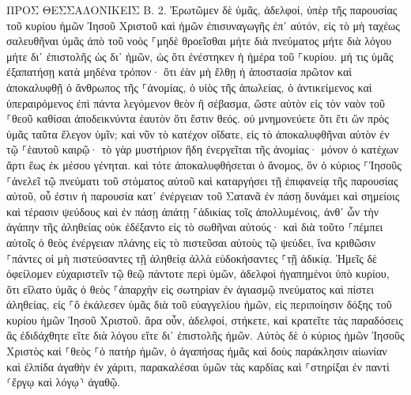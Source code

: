 \documentclass[twoside, 9pt]{extreport}
\begin{document}
ΠΡΟΣ ΘΕΣΣΑΛΟΝΙΚΕΙΣ Β.
2.
Ἐρωτῶμεν δὲ ὑμᾶς, ἀδελφοί, ὑπὲρ τῆς παρουσίας τοῦ κυρίου ἡμῶν Ἰησοῦ Χριστοῦ καὶ ἡμῶν ἐπισυναγωγῆς ἐπ᾽ αὐτόν, 
εἰς τὸ μὴ ταχέως σαλευθῆναι ὑμᾶς ἀπὸ τοῦ νοὸς ⸀μηδὲ θροεῖσθαι μήτε διὰ πνεύματος μήτε διὰ λόγου μήτε δι᾽ ἐπιστολῆς ὡς δι᾽ ἡμῶν, ὡς ὅτι ἐνέστηκεν ἡ ἡμέρα τοῦ ⸀κυρίου. 
μή τις ὑμᾶς ἐξαπατήσῃ κατὰ μηδένα τρόπον· ὅτι ἐὰν μὴ ἔλθῃ ἡ ἀποστασία πρῶτον καὶ ἀποκαλυφθῇ ὁ ἄνθρωπος τῆς ⸀ἀνομίας, ὁ υἱὸς τῆς ἀπωλείας, 
ὁ ἀντικείμενος καὶ ὑπεραιρόμενος ἐπὶ πάντα λεγόμενον θεὸν ἢ σέβασμα, ὥστε αὐτὸν εἰς τὸν ναὸν τοῦ ⸀θεοῦ καθίσαι ἀποδεικνύντα ἑαυτὸν ὅτι ἔστιν θεός. 
οὐ μνημονεύετε ὅτι ἔτι ὢν πρὸς ὑμᾶς ταῦτα ἔλεγον ὑμῖν; 
καὶ νῦν τὸ κατέχον οἴδατε, εἰς τὸ ἀποκαλυφθῆναι αὐτὸν ἐν τῷ ⸀ἑαυτοῦ καιρῷ· 
τὸ γὰρ μυστήριον ἤδη ἐνεργεῖται τῆς ἀνομίας· μόνον ὁ κατέχων ἄρτι ἕως ἐκ μέσου γένηται. 
καὶ τότε ἀποκαλυφθήσεται ὁ ἄνομος, ὃν ὁ κύριος ⸀Ἰησοῦς ⸀ἀνελεῖ τῷ πνεύματι τοῦ στόματος αὐτοῦ καὶ καταργήσει τῇ ἐπιφανείᾳ τῆς παρουσίας αὐτοῦ, 
οὗ ἐστιν ἡ παρουσία κατ᾽ ἐνέργειαν τοῦ Σατανᾶ ἐν πάσῃ δυνάμει καὶ σημείοις καὶ τέρασιν ψεύδους 
καὶ ἐν πάσῃ ἀπάτῃ ⸀ἀδικίας τοῖς ἀπολλυμένοις, ἀνθ᾽ ὧν τὴν ἀγάπην τῆς ἀληθείας οὐκ ἐδέξαντο εἰς τὸ σωθῆναι αὐτούς· 
καὶ διὰ τοῦτο ⸀πέμπει αὐτοῖς ὁ θεὸς ἐνέργειαν πλάνης εἰς τὸ πιστεῦσαι αὐτοὺς τῷ ψεύδει, 
ἵνα κριθῶσιν ⸀πάντες οἱ μὴ πιστεύσαντες τῇ ἀληθείᾳ ἀλλὰ εὐδοκήσαντες ⸀τῇ ἀδικίᾳ. 
Ἡμεῖς δὲ ὀφείλομεν εὐχαριστεῖν τῷ θεῷ πάντοτε περὶ ὑμῶν, ἀδελφοὶ ἠγαπημένοι ὑπὸ κυρίου, ὅτι εἵλατο ὑμᾶς ὁ θεὸς ⸀ἀπαρχὴν εἰς σωτηρίαν ἐν ἁγιασμῷ πνεύματος καὶ πίστει ἀληθείας, 
εἰς ⸀ὃ ἐκάλεσεν ὑμᾶς διὰ τοῦ εὐαγγελίου ἡμῶν, εἰς περιποίησιν δόξης τοῦ κυρίου ἡμῶν Ἰησοῦ Χριστοῦ. 
ἄρα οὖν, ἀδελφοί, στήκετε, καὶ κρατεῖτε τὰς παραδόσεις ἃς ἐδιδάχθητε εἴτε διὰ λόγου εἴτε δι᾽ ἐπιστολῆς ἡμῶν. 
Αὐτὸς δὲ ὁ κύριος ἡμῶν Ἰησοῦς Χριστὸς καὶ ⸀θεὸς ⸀ὁ πατὴρ ἡμῶν, ὁ ἀγαπήσας ἡμᾶς καὶ δοὺς παράκλησιν αἰωνίαν καὶ ἐλπίδα ἀγαθὴν ἐν χάριτι, 
παρακαλέσαι ὑμῶν τὰς καρδίας καὶ ⸀στηρίξαι ἐν παντὶ ⸂ἔργῳ καὶ λόγῳ⸃ ἀγαθῷ. 
\end{document}
